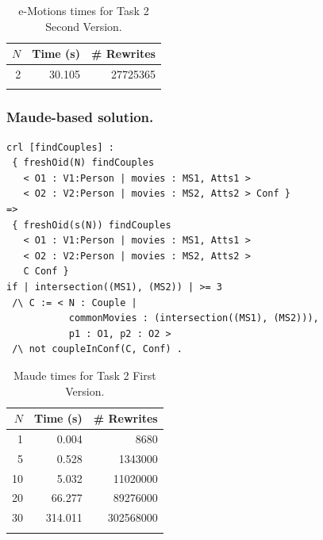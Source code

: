 \begin{table}
  \begin{center}
	\begin{tabular}{r r r}
	$N$ & Time (s) & \# Rewrites \\
	\hline
	2 & 30.105 & 27725365 \\
	\hline \\
	\end{tabular}
	\caption{e-Motions times for Task 2 Second Version.}\label{table:emotionstask22}
	\end{center}
\end{table}


\subsubsection{Maude-based solution.}


\begin{lstlisting}[caption=\code{createCouples} Maude rule., label=lst:oneRuleCouples]
crl [findCouples] :
 { freshOid(N) findCouples
   < O1 : V1:Person | movies : MS1, Atts1 >
   < O2 : V2:Person | movies : MS2, Atts2 > Conf }
=>
 { freshOid(s(N)) findCouples
   < O1 : V1:Person | movies : MS1, Atts1 >
   < O2 : V2:Person | movies : MS2, Atts2 >
   C Conf }
if | intersection((MS1), (MS2)) | >= 3
 /\ C := < N : Couple | 
           commonMovies : (intersection((MS1), (MS2))),
           p1 : O1, p2 : O2 >
 /\ not coupleInConf(C, Conf) .
\end{lstlisting}

\begin{table}
  \begin{center}
	\begin{tabular}{r r r}
	$N$ & Time (s) & \# Rewrites \\
	\hline
	1 & 0.004 & 8680 \\
	5 & 0.528 & 1343000 \\
	10 & 5.032 & 11020000 \\
	20 & 66.277 & 89276000 \\
	30 & 314.011 & 302568000 \\
	\hline \\
	\end{tabular}
	\caption{Maude times for Task 2 First Version.}\label{table:maudetask21}
	\end{center}
\end{table}

